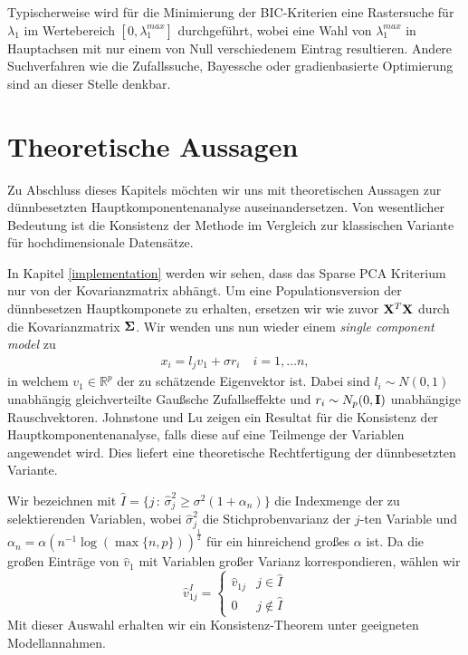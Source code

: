 Typischerweise wird für die Minimierung der BIC-Kriterien eine Rastersuche für $\lambda_1$ im Wertebereich $[0, \lambda_1^{max}]$ durchgeführt, wobei eine Wahl von $\lambda_1^{max}$ in Hauptachsen mit nur einem von Null verschiedenem Eintrag resultieren. Andere Suchverfahren wie die Zufallssuche, Bayessche oder gradienbasierte Optimierung sind an dieser Stelle denkbar. 




\section{Theoretische Aussagen} 
\label{spca_theorems}


Zu Abschluss dieses Kapitels möchten wir uns mit theoretischen Aussagen zur dünnbesetzten Hauptkomponentenanalyse auseinandersetzen. Von wesentlicher Bedeutung ist die Konsistenz der Methode im Vergleich zur klassischen Variante für hochdimensionale Datensätze.

In Kapitel \ref{implementation} werden wir sehen, dass das Sparse PCA Kriterium nur von der Kovarianzmatrix abhängt. Um eine Populationsversion der dünnbesetzen Hauptkomponete zu erhalten, ersetzen wir wie zuvor $\mathbf{X}^T \mathbf{X}$ durch die Kovarianzmatrix $\mathbf{\Sigma}$. Wir wenden uns nun wieder einem \textit{single component model} zu
\begin{align}
\label{single_component_model_spca}
x_i = l_j v_1 + \sigma r_i \quad i = 1, \ldots n,
\end{align}
in welchem $v_1 \in \mathbb{R}^p$ der zu schätzende Eigenvektor ist. Dabei sind $l_i \sim N(0,1)$ unabhängig gleichverteilte Gaußsche Zufallseffekte und $r_i \sim N_p(0, \mathbf{I})$ unabhängige Rauschvektoren. Johnstone und Lu \cite{johnstone} zeigen ein Resultat für die Konsistenz der Hauptkomponentenanalyse, falls diese auf eine Teilmenge der Variablen angewendet wird. Dies liefert eine theoretische Rechtfertigung der dünnbesetzten Variante.

Wir bezeichnen mit $\widehat{I} = \{j \, \colon \, \widehat{\sigma}_j^2 \geq \sigma^2 (1 + \alpha_n)\}$ die Indexmenge der zu selektierenden Variablen, wobei $\widehat{\sigma}_j^2$ die Stichprobenvarianz der $j$-ten Variable und $\alpha_n = \alpha (n^{-1}\log(\max \{n,p\}))^{\frac{1}{2}}$ für ein hinreichend großes $\alpha$ ist. Da die großen Einträge von $\widehat{v}_1$ mit Variablen großer Varianz korrespondieren, wählen wir 
$$\widehat{v}_{1j}^I = \begin{cases} 
      \widehat{v}_{1j} & j \in \widehat{I}\\
      0 & j \not\in \widehat{I}
   \end{cases}$$
Mit dieser Auswahl erhalten wir ein Konsistenz-Theorem unter geeigneten Modellannahmen.

